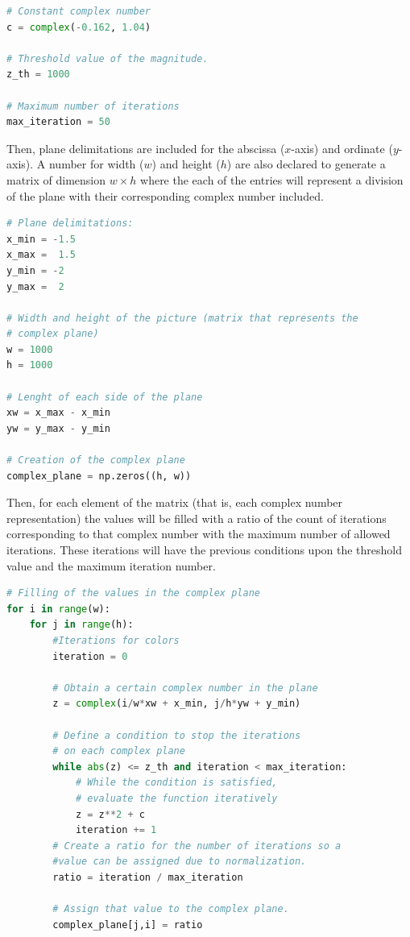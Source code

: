 \documentclass{article}
\begin{document}
\begin{lstlisting}[language=Python, frame=single]
# Constant complex number
c = complex(-0.162, 1.04)

# Threshold value of the magnitude.
z_th = 1000

# Maximum number of iterations
max_iteration = 50
\end{lstlisting}

Then, plane delimitations are included for the abscissa ($x$-axis) and ordinate ($y$-axis). A number for width ($w$) and height ($h$) are also declared to generate a matrix of dimension $w \times h$ where the each of the entries will represent a division of the plane with their corresponding complex number included.

\newpage
\begin{lstlisting}[language=Python, frame=single]
# Plane delimitations:
x_min = -1.5
x_max =  1.5
y_min = -2
y_max =  2

# Width and height of the picture (matrix that represents the
# complex plane) 
w = 1000
h = 1000

# Lenght of each side of the plane
xw = x_max - x_min
yw = y_max - y_min

# Creation of the complex plane
complex_plane = np.zeros((h, w))
\end{lstlisting}

Then, for each element of the matrix (that is, each complex number representation) the values will be filled with a ratio of the count of iterations corresponding to that complex number with the maximum number of allowed iterations. These iterations will have the previous conditions upon the threshold value and the maximum iteration number. 
\begin{lstlisting}[language=Python, frame=single]
# Filling of the values in the complex plane
for i in range(w):
    for j in range(h):
        #Iterations for colors
        iteration = 0
        
        # Obtain a certain complex number in the plane
        z = complex(i/w*xw + x_min, j/h*yw + y_min)
        
        # Define a condition to stop the iterations 
        # on each complex plane
        while abs(z) <= z_th and iteration < max_iteration:
            # While the condition is satisfied, 
            # evaluate the function iteratively
            z = z**2 + c
            iteration += 1
        # Create a ratio for the number of iterations so a
        #value can be assigned due to normalization.
        ratio = iteration / max_iteration
        
        # Assign that value to the complex plane. 
        complex_plane[j,i] = ratio
\end{lstlisting}
\end{document}
